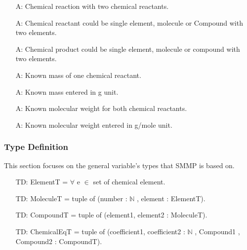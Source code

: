 \documentclass[12pt]{article}
\newcounter{assumpnum} %
\newcounter{typenum} %
\begin{document}
\begin{itemize}

\item[A\refstepcounter{assumpnum}\theassumpnum \label{Two reactants}:] Chemical reaction with two chemical reactants.
\item[A\refstepcounter{assumpnum}\theassumpnum \label{reactant compound}:] Chemical reactant could be single element, molecule or Compound with two elements.
\item[A\refstepcounter{assumpnum}\theassumpnum \label{product compound}:] Chemical product could be single element, molecule or compound with two elements.
\item[A\refstepcounter{assumpnum}\theassumpnum \label{Known mass}:] Known mass of one chemical reactant.
\item[A\refstepcounter{assumpnum}\theassumpnum \label{Mass unit}:] Known mass entered in g unit.
\item[A\refstepcounter{assumpnum}\theassumpnum \label{Known molecular weight}:] Known molecular weight for both chemical reactants.
\item[A\refstepcounter{assumpnum}\theassumpnum \label{Molecular weight unit}:] Known molecular weight entered in g/mole unit. 

\end{itemize}

\subsubsection{Type Definition}\label{Type_Detention}

This section focuses on the general variable's types that SMMP is based on.  
\begin{itemize}
\item[TD\refstepcounter{typenum}\thetypenum \label{elementT}:] ElementT = $\forall$ e $\in$ set of chemical element.
\item[TD\refstepcounter{typenum}\thetypenum \label{MoleculeT}:] MoleculeT = tuple of (number : $\mathbb{N}$ , element : ElementT).
\item[TD\refstepcounter{typenum}\thetypenum \label{CompoundT}:]  CompoundT =  tuple of (element1, element2 : MoleculeT).
\item[TD\refstepcounter{typenum}\thetypenum \label{ChemicalEqT}:] ChemicalEqT = tuple of  (coefficient1, coefficient2 : 
$\mathbb{N}$ , Compound1 , Compound2 : CompoundT). 


\end{itemize}
\end{document}
